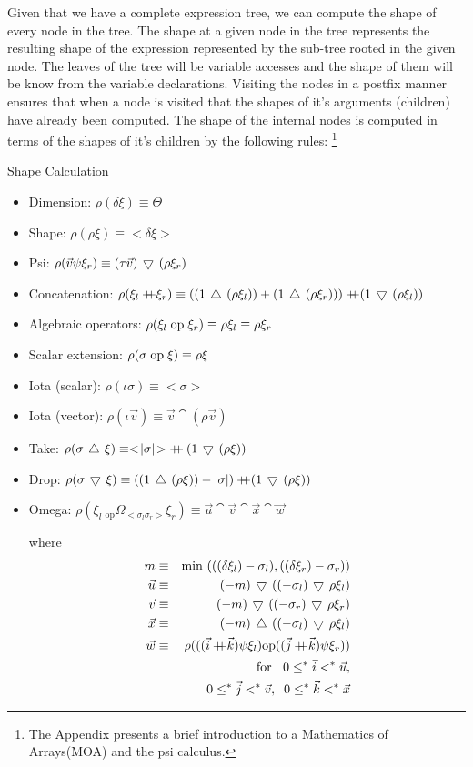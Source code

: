Given that we have a complete expression tree, we can compute the shape of 
every node in
the tree.  The shape at a given node in the tree represents the resulting 
shape of the expression represented by the sub-tree rooted in the given
node.  The leaves of the tree will be variable accesses and the shape of them
will be know from the variable declarations.  Visiting the nodes in a postfix 
manner ensures that when a node is visited that the shapes of it's arguments
(children) have already been computed.
The shape of the internal nodes is computed in terms of the shapes
of it's children by the following rules\cite{mul88}:
\footnote{The Appendix presents a brief introduction to a Mathematics
of Arrays(MOA) and the psi calculus.}
\begin{center}
Shape Calculation
\end{center}
\begin{itemize}
\item
Dimension: $\rho(\delta\xi) \equiv \Theta$
\item
Shape: $\rho(\rho\xi) \equiv <\delta\xi>$
\item
Psi: $\rho(\vec{v}\psi\xi_{r}) \equiv  (\tau\vec{v})\,\bigtriangledown\, (\rho\xi_{r})$
\item
Concatenation: $\rho(\xi_{l}\cat\xi_{r}) \equiv  ((1\take (\rho\xi_{l}))+(1\take (\rho\xi_{r})))
\cat (1\drop (\rho\xi_{l}))$
\item
Algebraic operators: $\rho(\xi_{l}\;\hbox{op}\;\xi_{r}) \equiv  \rho\xi_{l}
\equiv \rho\xi_{r}$
\item
Scalar extension: $\rho(\sigma\;\hbox{op}\;\xi) \equiv  \rho\xi$
\item
Iota (scalar): $\rho(\iota\sigma) \equiv  <\!\sigma\! >$
\item
Iota (vector): $\rho(\iota\vec{v}) \equiv \vec{v}\cat (\rho\vec{v})$
\item
Take: $\rho(\sigma\,\bigtriangleup\,\xi) \equiv  <\! |\sigma |\! >+\!\!\!\!+ (1\,\bigtriangledown\, (\rho\xi))$
\item
Drop: $\rho(\sigma\,\bigtriangledown\,\xi) \equiv ((1\,\bigtriangleup\, (\rho\xi))-|\sigma |)
+\!\!\!\!+ (1\,\bigtriangledown\, (\rho\xi))$
\item
Omega: $\rho(\xi_{l}\: _{\mbox{op}}\Omega_{<\sigma_{l} \sigma_{r}>} \xi_{r})
	\equiv \vec{u}\cat\vec{v}\cat\vec{x}\cat\vec{w}$
 
where
\begin{eqnarray*}
m & \equiv &  \mbox{min }(((\delta\xi_{l})-\sigma_{l}),((\delta\xi_{r})-\sigma_{r})) \\
\vec{u} & \equiv & (-m)\drop((-\sigma_{l})\drop\rho\xi_{l}) \\
\vec{v} & \equiv & (-m)\drop((-\sigma_{r})\drop\rho\xi_{r}) \\
\vec{x} & \equiv & (-m)\take((-\sigma_{l})\drop\rho\xi_{l}) \\
\vec{w} & \equiv & \rho(((\vec{i}\cat\vec{k})\psi\xi_{l})\mbox{op}
	((\vec{j}\cat\vec{k})\psi\xi_{r})) \\
 & & \mbox{for } \;\;0\leq^{*}\vec{i}<^{*}\vec{u},\\
& & 0\leq^{*}\vec{j}<^{*}\vec{v}, \;\;
	0\leq^{*}\vec{k}<^{*}\vec{x} \\
\end{eqnarray*}
\end{itemize}
 
